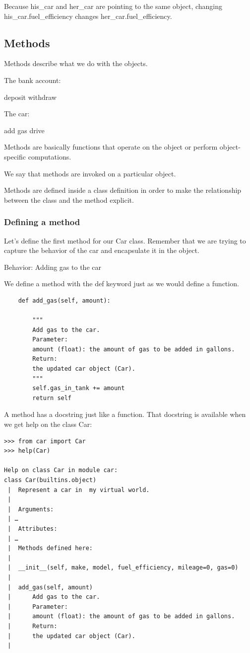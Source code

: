 \documentclass{article}
\begin{document}
Because his{\_}car and her{\_}car are pointing to the same object, changing his{\_}car.fuel{\_}efficiency changes her{\_}car.fuel{\_}efficiency.

\subsection{Methods}

Methods describe what we do with the objects.

The bank account:

deposit
withdraw

The car:

add gas
drive

Methods are basically functions that operate on the object or perform object-specific computations.

We say that methods are invoked on a particular object.

Methods are defined inside a class definition in order to make the relationship between the class and the method explicit.

\subsubsection{Defining a method}

Let's define the first method for our Car class.  Remember that we are trying to capture the behavior of the car and encapsulate it in the object.

Behavior:  Adding  gas to the car

We define a method with the def keyword just as we would define a function.

\begin{lstlisting}
    def add_gas(self, amount):

        """
        Add gas to the car.
        Parameter:
        amount (float): the amount of gas to be added in gallons.
        Return:
        the updated car object (Car).
        """
        self.gas_in_tank += amount
        return self
\end{lstlisting}

A method has a docstring just like a function.  That docstring is available when we get help on the class Car:

\begin{lstlisting}
>>> from car import Car
>>> help(Car)

Help on class Car in module car:
class Car(builtins.object)
 |  Represent a car in  my virtual world.
 | 
 |  Arguments:
 | … 
 |  Attributes:
 | … 
 |  Methods defined here:
 | 
 |  __init__(self, make, model, fuel_efficiency, mileage=0, gas=0)
 |  
 |  add_gas(self, amount)
 |      Add gas to the car.
 |      Parameter:
 |      amount (float): the amount of gas to be added in gallons.
 |      Return:
 |      the updated car object (Car).
 |  
\end{lstlisting}
\end{document}
